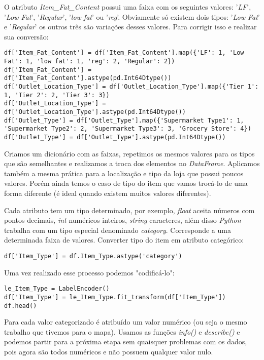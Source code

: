 O atributo \textit{Item\_Fat\_Content} possui uma faixa com os seguintes valores: '\textit{LF}', '\textit{Low Fat}', '\textit{Regular}', '\textit{low fat}' ou '\textit{reg}'. Obviamente só existem dois tipos: '\textit{Low Fat}' e '\textit{Regular}' os outros três são variações desses valores. Para corrigir isso e realizar sua conversão: 
\begin{lstlisting}[]
df['Item_Fat_Content'] = df['Item_Fat_Content'].map({'LF': 1, 'Low Fat': 1, 'low fat': 1, 'reg': 2, 'Regular': 2})
df['Item_Fat_Content'] = df['Item_Fat_Content'].astype(pd.Int64Dtype())
df['Outlet_Location_Type'] = df['Outlet_Location_Type'].map({'Tier 1': 1, 'Tier 2': 2, 'Tier 3': 3})
df['Outlet_Location_Type'] = df['Outlet_Location_Type'].astype(pd.Int64Dtype())
df['Outlet_Type'] = df['Outlet_Type'].map({'Supermarket Type1': 1, 'Supermarket Type2': 2, 'Supermarket Type3': 3, 'Grocery Store': 4})
df['Outlet_Type'] = df['Outlet_Type'].astype(pd.Int64Dtype())
\end{lstlisting}

Criamos um dicionário com as faixas, repetimos os mesmos valores para os tipos que são semelhantes e realizamos a troca dos elementos no \textit{DataFrame}. Aplicamos também a mesma prática para a localização e tipo da loja que possui poucos valores. Porém ainda temos o caso de tipo do item que vamos trocá-lo de uma forma diferente (é ideal quando existem muitos valores diferentes).

Cada atributo tem um tipo determinado, por exemplo, \textit{float} aceita números com pontos decimais, \textit{int} numéricos inteiros, \textit{string} caracteres, além disso \textit{Python} trabalha com um tipo especial denominado \textit{category}. Corresponde a uma determinada faixa de valores. Converter tipo do item em atributo categórico:
\begin{lstlisting}[]
df['Item_Type'] = df.Item_Type.astype('category')
\end{lstlisting}

Uma vez realizado esse processo podemos "codificá-lo":
\begin{lstlisting}[]
le_Item_Type = LabelEncoder()
df['Item_Type'] = le_Item_Type.fit_transform(df['Item_Type'])
df.head()
\end{lstlisting}

Para cada valor categorizado é atribuído um valor numérico (ou seja o mesmo trabalho que tivemos para o mapa). Usamos as funções \textit{info()} e \textit{describe()} e podemos partir para a próxima etapa sem quaisquer problemas com os dados, pois agora são todos numéricos e não possuem qualquer valor nulo.

